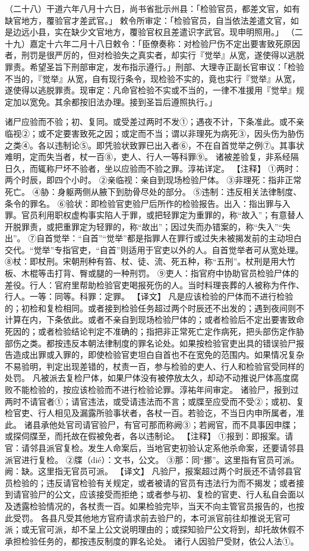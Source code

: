 \documentclass[12pt,UTF8]{ctexbook}
\begin{document}
（二十八）干道六年八月十六日，尚书省批示州县：「检验官员，都差文官，如有缺官地方，覆验官才差武官。」
敕令所审定：「检验官员，自当依法差遣文官，如是边远小县，实在缺少文官地方，覆验官权且差遣识字武官。现申明照用。」
（二十九）嘉定十六年二月十八日敕令：「臣僚奏称：对检验尸伤不定出要害致死原因者，刑罚是很严厉的，但对检验失之真实者，却实行『觉举』从宽，遂使得以逃脱罪责。希望圣旨下刑部审定，发布指示遵行。」刑部、大理寺正副长官审议：「检验不当的，『觉举』从宽，自有现行条令，现检验不实的，竟也实行『觉举』从宽，遂使得以逃脱罪责。现审定：凡命官检验不实或不当的，一律不准援用『觉举』规定加以宽免。其余都按旧法办理。接到圣旨后遵照执行。」

诸尸应验而不验；初、复同。或受差过两时不发①；遇夜不计，下条准此。或不亲临视②；或不定要害致死之因；或定而不当；谓以非理死为病死③，因头伤为胁伤之类④。各以违制论⑤。即凭验状致罪已出入者⑥，不在自首觉举之例⑦。其事状难明，定而失当者，杖一百⑧，吏人、行人一等科罪⑨。
诸被差验复，非系经隔日久，而辄称尸坏不验者，坐以应验而不验之罪。淳祐详定。
【注释】
①两时：两个时辰，即四个小时。
②亲临视：亲自到现场检验尸体。
③非理死：指非正常死亡。
④胁：身躯两侧从腋下到肋骨尽处的部分。
⑤违制：违反相关法律制度、条令的罪名。
⑥验状：即检验官吏验尸后所作的检验报告。出入：指出罪与入罪。官员利用职权虚构事实陷人于罪，或把轻罪定为重罪的，称“故入”；有意替人开脱罪责，或把重罪定为轻罪的，称“故出”；因过失而办错案的，称“失入”“失出”。
⑦自首觉举：“自首”“觉举”都是指罪人在罪行或过失未被揭发前的主动坦白交代。“觉举”专指官吏，“自首”则适用于官吏以外的人。自首觉举者可从宽处理。
⑧杖：即杖刑。宋朝刑种有笞、杖、徒、流、死五种，称“五刑”。杖刑是用大竹板、木棍等击打背、臀或腿的一种刑罚。
⑨吏人：指官府中协助官员检验尸体的差役。行人：官府里帮助检验官吏喝报死伤的人。当时料理丧葬的人被称为仵作、行人。一等：同等。科罪：定罪。
【译文】
凡是应该检验的尸体而不进行检验的；初检和复检相同。或者接到检验任务超过两个时辰还不出发的；遇到夜间则不计算在内，下条依此。或者不亲自到现场检验尸体的；或者检验后不定出要害致命死因的；或者检验结论判定不准确的；指把非正常死亡定作病死，把头部伤定作胁部伤之类。都按违反本朝法律制度的罪名论处。如果按检验官吏出具的错误验尸报告造成出罪或入罪的，即使检验官吏坦白自首也不在宽免的范围内。如果情况复杂不易验明，判定出现差错的，杖责一百，参与检验的吏人、行人和检验官受同样的处罚。
凡被派去复检尸体，如果尸体没有被停放太久，却动不动推说尸体高度腐败不能检验的，按应该检验而不进行检验论罪。淳祐年间审定。
诸验尸，报到过两时不请官者①；请官违法，或受请违法而不言；或牒至应受而不受②；或初、复检官吏、行人相见及漏露所验事状者，各杖一百。若验讫，不当日内申所属者，准此。
诸县承他处官司请官验尸，有官可那而称阙③；若阙官，而不具事因申牒；或探伺牒至，而托故在假被免者，各以违制论。
【注释】
①报到：即报案。请官：请邻县派官复检。发生人命案后，当地官吏初验认定系他杀命案，还要请邻县派官进行复检。
②牒（dié）：文书，公文。
③那：同“挪”。这里指有官员可派。阙：缺。这里指无官员可派。
【译文】
凡验尸，报案超过两个时辰还不请邻县官员检验的；违反请官检验有关规定，或者被请的官员有违法行为而不揭发；或者接到请官验尸的公文，应该接受而拒绝；或者参与初、复检的官吏、行人私自会面以及透露检验情况的，各杖责一百。如果检验完毕，当天不向主管官员报告的，也按此受罚。
各县凡受其他地方官府请求前去验尸的，本可派官前往却推说无官可派；或无官可派，却不呈上公文说明理由的；或探知验尸公文将到，却托故休假不承担检验任务的，都按违反制度的罪名论处。
诸行人因验尸受财，依公人法①。
\end{document}
